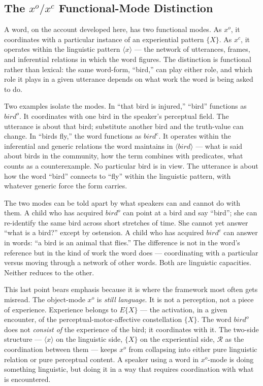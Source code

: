 \documentclass[12pt,a4paper]{article}
\begin{document}
\subsection{\texorpdfstring{The \(x^o/x^c\) Functional-Mode Distinction}{The x\^{}o/x\^{}c Functional-Mode Distinction}}\label{the-xoxc-functional-mode-distinction}

A word, on the account developed here, has two functional modes. As \(x^o\), it coordinates with a particular instance of an experiential pattern \(\{X\}\). As \(x^c\), it operates within the linguistic pattern \(\langle x \rangle\) --- the network of utterances, frames, and inferential relations in which the word figures. The distinction is functional rather than lexical: the same word-form, ``bird,'' can play either role, and which role it plays in a given utterance depends on what work the word is being asked to do.

Two examples isolate the modes. In ``that bird is injured,'' ``bird'' functions as \(bird^o\). It coordinates with one bird in the speaker's perceptual field. The utterance is about that bird; substitute another bird and the truth-value can change. In ``birds fly,'' the word functions as \(bird^c\). It operates within the inferential and generic relations the word maintains in \(\langle bird \rangle\) --- what is said about birds in the community, how the term combines with predicates, what counts as a counterexample. No particular bird is in view. The utterance is about how the word ``bird'' connects to ``fly'' within the linguistic pattern, with whatever generic force the form carries.

The two modes can be told apart by what speakers can and cannot do with them. A child who has acquired \(bird^o\) can point at a bird and say ``bird''; she can re-identify the same bird across short stretches of time. She cannot yet answer ``what is a bird?'' except by ostension. A child who has acquired \(bird^c\) can answer in words: ``a bird is an animal that flies.'' The difference is not in the word's reference but in the kind of work the word does --- coordinating with a particular versus moving through a network of other words. Both are linguistic capacities. Neither reduces to the other.

This last point bears emphasis because it is where the framework most often gets misread. The object-mode \(x^o\) is \emph{still language}. It is not a perception, not a piece of experience. Experience belongs to \(E\{X\}\) --- the activation, in a given encounter, of the perceptual-motor-affective constellation \(\{X\}\). The word \(bird^o\) does not \emph{consist of} the experience of the bird; it coordinates with it. The two-side structure --- \(\langle x \rangle\) on the linguistic side, \(\{X\}\) on the experiential side, \(\mathcal{R}\) as the coordination between them --- keeps \(x^o\) from collapsing into either pure linguistic relation or pure perceptual content. A speaker using a word in \(x^o\)-mode is doing something linguistic, but doing it in a way that requires coordination with what is encountered.
\end{document}
